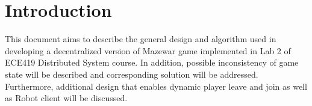 \section{Introduction}\label{Intro}

This document aims to describe the general design and algorithm used in developing a decentralized version of Mazewar game implemented in Lab 2 of ECE419 Distributed System course. In addition, possible inconsistency of game state will be described and corresponding solution will be addressed. Furthermore, additional design that enables dynamic player leave and join as well as Robot client will be discussed.
